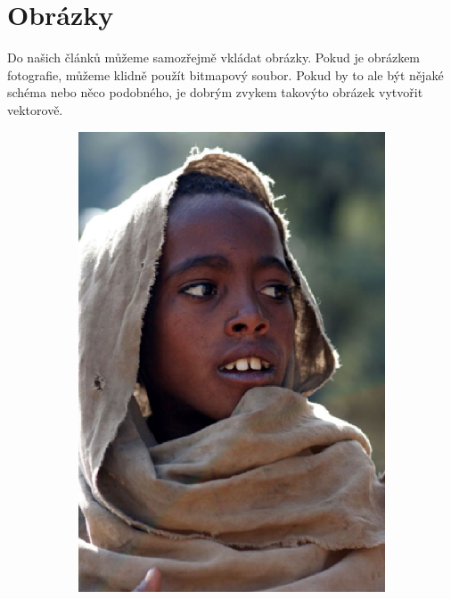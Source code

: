 \documentclass[a4paper,11pt]{article}
\begin{document}
    \section{Obrázky}
    Do našich článků můžeme samozřejmě vkládat obrázky. Pokud je obrázkem fotografie, můžeme
    klidně použít bitmapový soubor. Pokud by to ale být nějaké schéma nebo něco podobného, 
    je dobrým zvykem takovýto obrázek vytvořit vektorově.
    \begin{figure}[H]
        \centering
        \begin{subfigure}[b]{0.25\textwidth}
            \centering
            \includegraphics[width=\textwidth]{etiopan.eps}
        \end{subfigure}
        \begin{subfigure}[b]{0.25\textwidth}

\end{subfigure}
\end{figure}
\end{document}
